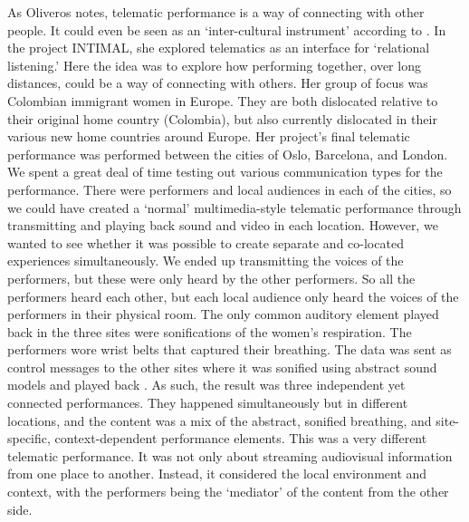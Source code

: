 As Oliveros notes, telematic performance is a way of connecting with other people. It could even be seen as an `inter-cultural instrument' according to \citet{alarcon_diaz_sensing_2019}. In the project INTIMAL, she explored telematics as an interface for `relational listening.' Here the idea was to explore how performing together, over long distances, could be a way of connecting with others. Her group of focus was Colombian immigrant women in Europe. They are both dislocated relative to their original home country (Colombia), but also currently dislocated in their various new home countries around Europe. Her project's final telematic performance was performed between the cities of Oslo, Barcelona, and London. %
We spent a great deal of time testing out various communication types for the performance. There were performers and local audiences in each of the cities, so we could have created a `normal' multimedia-style telematic performance through transmitting and playing back sound and video in each location. However, we wanted to see whether it was possible to create separate and co-located experiences simultaneously. We ended up transmitting the voices of the performers, but these were only heard by the other performers. So all the performers heard each other, but each local audience only heard the voices of the performers in their physical room. The only common auditory element played back in the three sites were sonifications of the women's respiration. The performers wore wrist belts that captured their breathing. The data was sent as control messages to the other sites where it was sonified using abstract sound models and played back \citep{alarcon_diaz_ellos_2019}. As such, the result was three independent yet connected performances. They happened simultaneously but in different locations, and the content was a mix of the abstract, sonified breathing, and site-specific, context-dependent performance elements. This was a very different telematic performance. It was not only about streaming audiovisual information from one place to another. Instead, it considered the local environment and context, with the performers being the `mediator' of the content from the other side.




